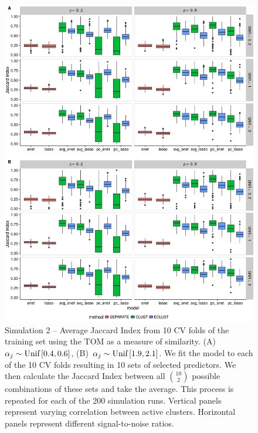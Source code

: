 \begin{appendices}
\begin{figure}[H]
	\centering
	\includegraphics[scale=0.55, keepaspectratio]{./figs/hydra/results/figures/sim2-sept8/jacc_TOM_sim2.png}
	\caption{Simulation 2 -- Average Jaccard Index from 10 CV folds of the training set using the TOM as a measure of similarity. \mbox{(A) $\alpha_{j} \sim \textrm{{Unif}}\left[0.4, 0.6\right]$}, \mbox{(B) $\alpha_{j} \sim \textrm{{Unif}}\left[1.9, 2.1\right]$}. We fit the model to each of the 10 CV folds resulting in 10 sets of selected predictors. We then calculate the Jaccard Index between all $\binom{10}{2}$ possible combinations of these sets and take the average. This process is repeated for each of the 200 simulation runs. Vertical panels represent varying correlation between active clusters. Horizontal panels represent different signal-to-noise ratios.}
	\label{fig:jacc_TOM_sim2}
\end{figure}



\end{appendices}
